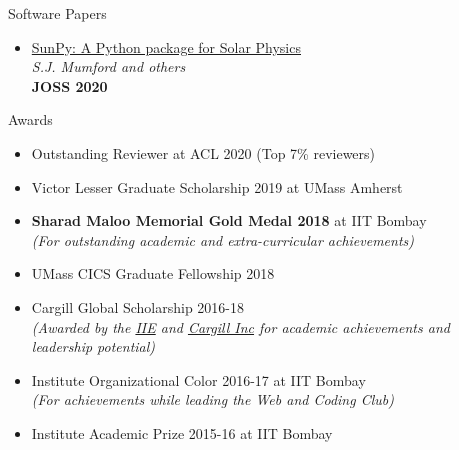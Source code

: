 \documentclass{resume} %
\begin{document}
\begin{rSection}{Software Papers}
\vspace*{0.1in}
\begin{itemize}[leftmargin=*]
\item \href{https://joss.theoj.org/papers/10.21105/joss.01832}{SunPy: A Python package for Solar Physics} \\ \textit{S.J. Mumford and others} \\ \textbf{JOSS 2020}
\end{itemize}
\end{rSection}

\begin{rSection}{Awards}
\vspace*{0.1in}
\begin{itemize}[leftmargin=*]
\item Outstanding Reviewer at ACL 2020 (Top 7\% reviewers)
\item Victor Lesser Graduate Scholarship 2019 at UMass Amherst
\item \textbf{Sharad Maloo Memorial Gold Medal 2018} at IIT Bombay\\
\textit{(For outstanding academic and extra-curricular achievements)}
\item UMass CICS Graduate Fellowship 2018
\item Cargill Global Scholarship 2016-18 \\
\textit{(Awarded by the \href{https://en.wikipedia.org/wiki/Institute_of_International_Education}{IIE} and \href{https://en.wikipedia.org/wiki/Cargill}{Cargill Inc} for academic achievements and leadership potential)}
\item Institute Organizational Color 2016-17 at IIT Bombay \\
\textit{(For achievements while leading the Web and Coding Club)}
\item Institute Academic Prize 2015-16 at IIT Bombay
\end{itemize}
\end{rSection}
\end{document}
